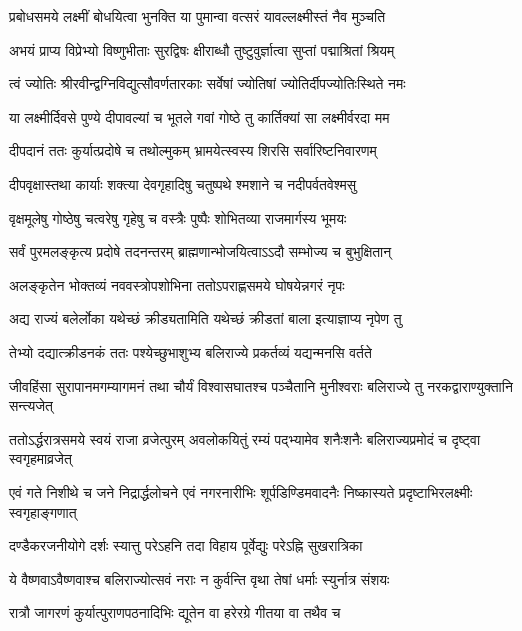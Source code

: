 \twolineshloka
{प्रबोधसमये लक्ष्मीं बोधयित्वा भुनक्ति या}
{पुमान्वा वत्सरं यावल्लक्ष्मीस्तं नैव मुञ्चति} %

\twolineshloka
{अभयं प्राप्य विप्रेभ्यो विष्णुभीताः सुरद्विषः}
{क्षीराब्धौ तुष्टुवुर्ज्ञात्वा सुप्तां पद्माश्रितां श्रियम्} %

\twolineshloka
{त्वं ज्योतिः श्रीरवीन्द्वग्निविद्युत्सौवर्णतारकाः}
{सर्वेषां ज्योतिषां ज्योतिर्दीपज्योतिःस्थिते नमः} %

\twolineshloka
{या लक्ष्मीर्दिवसे पुण्ये दीपावल्यां च भूतले}
{गवां गोष्ठे तु कार्तिक्यां सा लक्ष्मीर्वरदा मम} %

\twolineshloka
{दीपदानं ततः कुर्यात्प्रदोषे च तथोल्मुकम्}
{भ्रामयेत्स्वस्य शिरसि सर्वारिष्टनिवारणम्} %

\twolineshloka
{दीपवृक्षास्तथा कार्याः शक्त्या देवगृहादिषु}
{चतुष्पथे श्मशाने च नदीपर्वतवेश्मसु} %

\twolineshloka
{वृक्षमूलेषु गोष्ठेषु चत्वरेषु गृहेषु च}
{वस्त्रैः पुष्पैः शोभितव्या राजमार्गस्य भूमयः} %

\twolineshloka
{सर्वं पुरमलङ्कृत्य प्रदोषे तदनन्तरम्}
{ब्राह्मणान्भोजयित्वाऽऽदौ सम्भोज्य च बुभुक्षितान्} %

\twolineshloka
{अलङ्कृतेन भोक्तव्यं नववस्त्रोपशोभिना}
{ततोऽपराह्णसमये घोषयेन्नगरं नृपः} %

\twolineshloka
{अद्य राज्यं बलेर्लोका यथेच्छं क्रीड्यतामिति}
{यथेच्छं क्रीडतां बाला इत्याज्ञाप्य नृपेण तु} %

\twolineshloka
{तेभ्यो दद्यात्क्रीडनकं ततः पश्येच्छुभाशुभ्य}
{बलिराज्ये प्रकर्तव्यं यद्यन्मनसि वर्तते} %

\threelineshloka
{जीवहिंसा सुरापानमगम्यागमनं तथा}
{चौर्यं विश्वासघातश्च पञ्चैतानि मुनीश्वराः}
{बलिराज्ये तु नरकद्वाराण्युक्तानि सन्त्यजेत्} %

\threelineshloka
{ततोऽर्द्धरात्रसमये स्वयं राजा व्रजेत्पुरम्}
{अवलोकयितुं रम्यं पद्भ्यामेव शनैःशनैः}
{बलिराज्यप्रमोदं च दृष्ट्वा स्वगृहमाव्रजेत्} %

\threelineshloka
{एवं गते निशीथे च जने निद्रार्द्धलोचने}
{एवं नगरनारीभिः शूर्पडिण्डिमवादनैः}
{निष्कास्यते प्रदृष्टाभिरलक्ष्मीः स्वगृहाङ्गणात्} %

\twolineshloka
{दण्डैकरजनीयोगे दर्शः स्यात्तु परेऽहनि}
{तदा विहाय पूर्वेद्युः परेऽह्नि सुखरात्रिका} %

\twolineshloka
{ये वैष्णवाऽवैष्णवाश्च बलिराज्योत्सवं नराः}
{न कुर्वन्ति वृथा तेषां धर्माः स्युर्नात्र संशयः} %

\twolineshloka
{रात्रौ जागरणं कुर्यात्पुराणपठनादिभिः}
{द्यूतेन वा हरेरग्रे गीतया वा तथैव च} %


